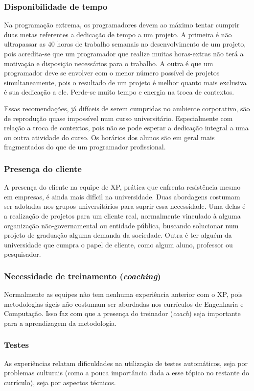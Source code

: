     \subsubsection{Disponibilidade de tempo}
      Na programação extrema, os programadores devem ao máximo tentar cumprir duas metas referentes a dedicação de tempo a um projeto. A primeira é não ultrapassar as 40 horas de trabalho semanais no desenvolvimento de um projeto, pois acredita-se que um programador que realize muitas horas-extras não terá a motivação e disposição necessários para o trabalho. A outra é que um programador deve se envolver com o menor número possível de projetos simultaneamente, pois o resultado de um projeto é melhor quanto mais exclusiva é sua dedicação a ele. Perde-se muito tempo e energia na troca de contextos.

      Essas recomendações, já difíceis de serem cumpridas no ambiente corporativo, são de reprodução quase impossível num curso universitário. Especialmente com relação a troca de contextos, pois não se pode esperar a dedicação integral a uma ou outra atividade do curso. Os horários dos alunos são em geral mais fragmentados do que de um programador profissional.

    \subsubsection{Presença do cliente}
      A presença do cliente na equipe de XP, prática que enfrenta resistência mesmo em empresas, é ainda mais difícil na universidade. Duas abordagens costumam ser adotadas nos grupos universitários para suprir essa necessidade. Uma delas é a realização de projetos para um cliente real, normalmente vinculado à alguma organização não-governamental ou entidade pública, buscando solucionar num projeto de graduação alguma demanda da sociedade. Outra é ter alguém da universidade que cumpra o papel de cliente, como algum aluno, professor ou pesquisador.

    \subsubsection{Necessidade de treinamento (\textit{coaching})}
      Normalmente as equipes não tem nenhuma experiência anterior com o XP, pois metodologias ágeis não costumam ser abordadas nos currículos de Engenharia e Computação. Isso faz com que a presença do treinador (\textit{coach}) seja importante para a aprendizagem da metodologia.

    \subsubsection{Testes}
      As experiências relatam dificuldades na utilização de testes automáticos, seja por problemas culturais (como a pouca importância dada a esse tópico no restante do currículo), seja por aspectos técnicos.

